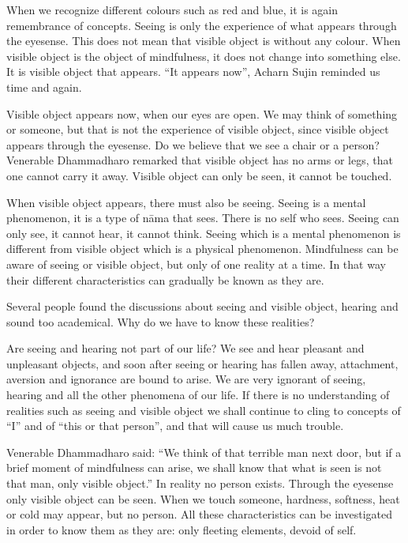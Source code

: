 When we recognize different colours such as red and blue, it is again
remembrance of concepts. Seeing is only the experience of what appears
through the eyesense. This does not mean that visible object is without
any colour. When visible object is the object of mindfulness, it does
not change into something else. It is visible object that appears. ``It
appears now'', Acharn Sujin reminded us time and again.

Visible object appears now, when our eyes are open. We may think of
something or someone, but that is not the experience of visible object,
since visible object appears through the eyesense. Do we believe that we
see a chair or a person? Venerable Dhammadharo remarked that visible
object has no arms or legs, that one cannot carry it away. Visible
object can only be seen, it cannot be touched.

When visible object appears, there must also be seeing. Seeing is a
mental phenomenon, it is a type of nāma that sees. There is no self who
sees. Seeing can only see, it cannot hear, it cannot think. Seeing which
is a mental phenomenon is different from visible object which is a
physical phenomenon. Mindfulness can be aware of seeing or visible
object, but only of one reality at a time. In that way their different
characteristics can gradually be known as they are.

Several people found the discussions about seeing and visible object,
hearing and sound too academical. Why do we have to know these
realities?

Are seeing and hearing not part of our life? We see and hear pleasant
and unpleasant objects, and soon after seeing or hearing has fallen
away, attachment, aversion and ignorance are bound to arise. We are very
ignorant of seeing, hearing and all the other phenomena of our life. If
there is no understanding of realities such as seeing and visible object
we shall continue to cling to concepts of ``I'' and of ``this or that
person'', and that will cause us much trouble.

Venerable Dhammadharo said: ``We think of that terrible man next door,
but if a brief moment of mindfulness can arise, we shall know that what
is seen is not that man, only visible object.'' In reality no person
exists. Through the eyesense only visible object can be seen. When we
touch someone, hardness, softness, heat or cold may appear, but no
person. All these characteristics can be investigated in order to know
them as they are: only fleeting elements, devoid of self.

